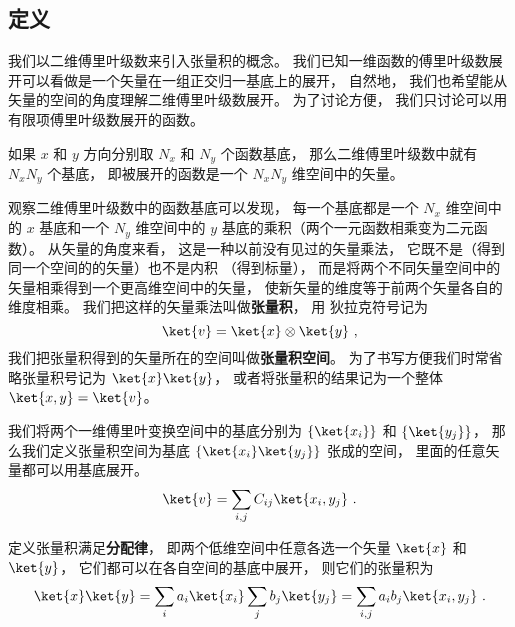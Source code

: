 

\subsection{定义}

我们以二维傅里叶级数来引入张量积的概念。 我们已知一维函数的傅里叶级数展开可以看做是一个矢量在一组正交归一基底上的展开， 自然地， 我们也希望能从矢量的空间的角度理解二维傅里叶级数展开。 为了讨论方便， 我们只讨论可以用有限项傅里叶级数展开的函数。

如果 $x$ 和 $y$ 方向分别取 $N_x$ 和 $N_y$ 个函数基底， 那么二维傅里叶级数中就有 $N_xN_y$ 个基底， 即被展开的函数是一个 $N_xN_y$ 维空间中的矢量。

观察二维傅里叶级数中的函数基底可以发现， 每一个基底都是一个 $N_x$ 维空间中的 $x$ 基底和一个 $N_y$ 维空间中的 $y$ 基底的乘积（两个一元函数相乘变为二元函数）。 从矢量的角度来看， 这是一种以前没有见过的矢量乘法， 它既不是（得到同一个空间的的矢量）也不是内积%
（得到标量）， 而是将两个不同矢量空间中的矢量相乘得到一个更高维空间中的矢量， 使新矢量的维度等于前两个矢量各自的维度相乘。 我们把这样的矢量乘法叫做\textbf{张量积}， 用
狄拉克符号记为
\begin{equation}
\ket{v} = \ket{x} \otimes \ket{y}~,
\end{equation}
我们把张量积得到的矢量所在的空间叫做\textbf{张量积空间}。 为了书写方便我们时常省略张量积号记为 $\ket{x}\ket{y}$， 或者将张量积的结果记为一个整体 $\ket{x, y} = \ket{v}$。

我们将两个一维傅里叶变换空间中的基底分别为 $\{\ket{x_i}\}$ 和 $\{\ket{y_j}\}$， 那么我们定义张量积空间为基底 $\{\ket{x_i}\ket{y_j}\}$ 张成的空间， 里面的任意矢量都可以用基底展开。
\begin{equation}
\ket{v} = \sum_{i,j} C_{ij}\ket{x_i, y_j}~.
\end{equation}

定义张量积满足\textbf{分配律}， 即两个低维空间中任意各选一个矢量 $\ket{x}$ 和 $\ket{y}$， 它们都可以在各自空间的基底中展开， 则它们的张量积为
\begin{equation}\label{eq_DirPro_2}
\ket{x}\ket{y} = \sum_i a_i\ket{x_i} \sum_j b_j\ket{y_j}
= \sum_{i,j} a_i b_j \ket{x_i, y_j}~.
\end{equation}

